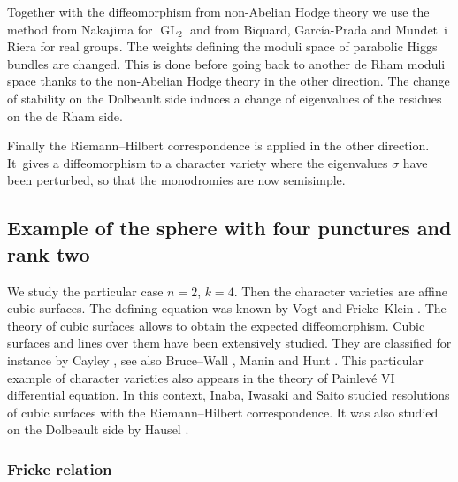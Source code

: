 \documentclass[JEP,XML,SOM,NoEqCountersInSection,Unicode,published]{cedram}
\theoremstyle{definition}
\theoremstyle{plain}
\DeclareMathOperator{\GL}{GL}
\begin{document}
Together with the diffeomorphism from non-Abelian Hodge theory we use the method from Nakajima \cite{Nakajima_1996} for $\GL_2$ and from Biquard, García-Prada and Mundet~i Riera \cite{Biquard_Garcia_Prada_Riera} for real groups. The weights defining the moduli space of parabolic Higgs bundles are changed. This is done before going back to another de Rham moduli space thanks to the non-Abelian Hodge theory in the other direction. The change of stability on the Dolbeault side induces a change of eigenvalues of the residues on the de Rham side.

Finally the Riemann--Hilbert correspondence is applied in the other direction. It~gives a diffeomorphism to a character variety where the eigenvalues $\sigma$ have been perturbed, so that the monodromies are now semisimple.

\subsection{Example of the sphere with four punctures and rank two}\label{sect_example_sphere}
We study the particular case $n=2$, $k=4$. Then the character varieties are affine cubic surfaces. The defining equation was known by Vogt \cite{Vogt} and Fricke--Klein \cite{Fricke_Klein}. The theory of cubic surfaces allows to obtain the expected diffeomorphism. Cubic surfaces and lines over them have been extensively studied. They are classified for instance by Cayley \cite{Cayley}, see also Bruce--Wall \cite{Bruce_cubic}, Manin \cite{Manin1986} and Hunt \cite{Hunt}. This particular example of character varieties also appears in the theory of Painlevé VI differential equation. In this context, Inaba, Iwasaki and Saito \cite{Inaba_Iwasaki_Saito,Inaba_Iwasaki_Saito_I,Inaba_Iwasaki_Saito_II} studied resolutions of cubic surfaces with the Riemann--Hilbert correspondence. It was also studied on the Dolbeault side by Hausel \cite{Hausel98}.

\subsubsection{Fricke relation}
\end{document}
